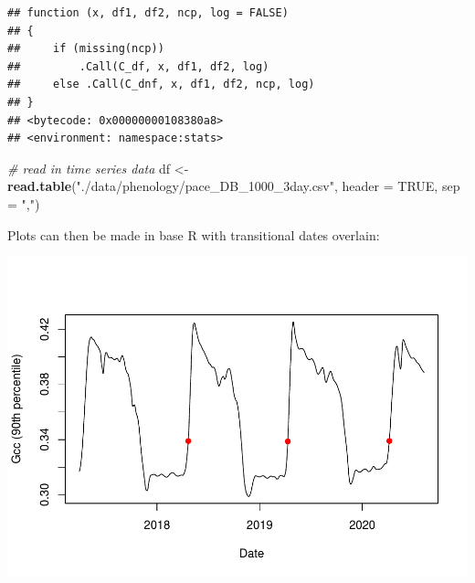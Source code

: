 \documentclass[
]{article}
\newenvironment{Shaded}{\begin{snugshade}}{\end{snugshade}}
\newcommand{\CommentTok}[1]{\textcolor[rgb]{0.56,0.35,0.01}{\textit{#1}}}
\newcommand{\DataTypeTok}[1]{\textcolor[rgb]{0.13,0.29,0.53}{#1}}
\newcommand{\DecValTok}[1]{\textcolor[rgb]{0.00,0.00,0.81}{#1}}
\newcommand{\KeywordTok}[1]{\textcolor[rgb]{0.13,0.29,0.53}{\textbf{#1}}}
\newcommand{\NormalTok}[1]{#1}
\newcommand{\OperatorTok}[1]{\textcolor[rgb]{0.81,0.36,0.00}{\textbf{#1}}}
\newcommand{\OtherTok}[1]{\textcolor[rgb]{0.56,0.35,0.01}{#1}}
\newcommand{\StringTok}[1]{\textcolor[rgb]{0.31,0.60,0.02}{#1}}
\begin{document}
\begin{verbatim}
## function (x, df1, df2, ncp, log = FALSE) 
## {
##     if (missing(ncp)) 
##         .Call(C_df, x, df1, df2, log)
##     else .Call(C_dnf, x, df1, df2, ncp, log)
## }
## <bytecode: 0x00000000108380a8>
## <environment: namespace:stats>
\end{verbatim}

\begin{Shaded}
\begin{Highlighting}[]
\CommentTok{\# read in time series data}
\NormalTok{df \textless{}{-}}\StringTok{ }\KeywordTok{read.table}\NormalTok{(}\StringTok{"./data/phenology/pace\_DB\_1000\_3day.csv"}\NormalTok{,}
                 \DataTypeTok{header =} \OtherTok{TRUE}\NormalTok{,}
                 \DataTypeTok{sep =} \StringTok{","}\NormalTok{)}
\end{Highlighting}
\end{Shaded}

Plots can then be made in base R with transitional dates overlain:

\begin{Shaded}
\end{Shaded}

\includegraphics{phenology_example_files/figure-latex/plotting-1.pdf}
\end{document}
